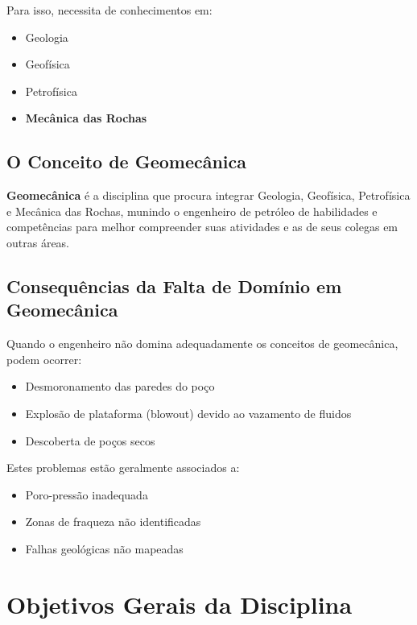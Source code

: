 \documentclass[12pt,a4paper,twoside]{book}
\begin{document}
Para isso, necessita de conhecimentos em:
\begin{itemize}
    \item Geologia
    \item Geofísica
    \item Petrofísica
    \item \textbf{Mecânica das Rochas}
\end{itemize}

\subsection{O Conceito de Geomecânica}

\textbf{Geomecânica} é a disciplina que procura integrar Geologia, Geofísica, Petrofísica e 
Mecânica das Rochas, munindo o engenheiro de petróleo de habilidades e competências para melhor 
compreender suas atividades e as de seus colegas em outras áreas.

\subsection{Consequências da Falta de Domínio em Geomecânica}

Quando o engenheiro não domina adequadamente os conceitos de geomecânica, podem ocorrer:
\begin{itemize}
    \item Desmoronamento das paredes do poço
    \item Explosão de plataforma (blowout) devido ao vazamento de fluidos
    \item Descoberta de poços secos
\end{itemize}

Estes problemas estão geralmente associados a:
\begin{itemize}
    \item Poro-pressão inadequada
    \item Zonas de fraqueza não identificadas
    \item Falhas geológicas não mapeadas
\end{itemize}

\section{Objetivos Gerais da Disciplina}
\end{document}
